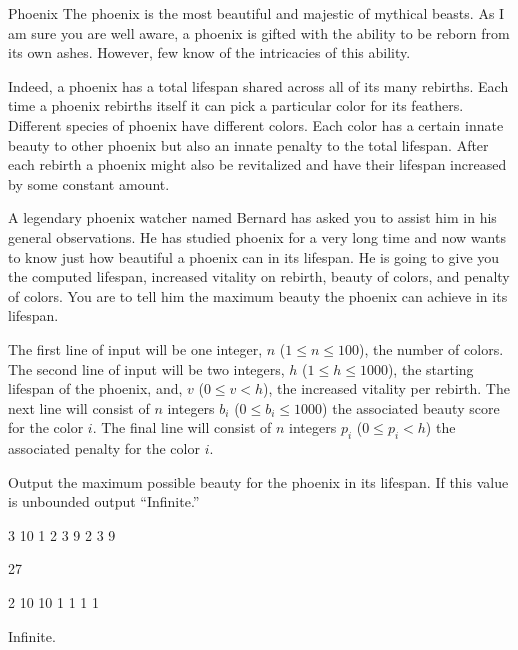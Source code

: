 \begin{problem}{Phoenix}
The phoenix is the most beautiful and majestic of mythical beasts.
As I am sure you are well aware, a phoenix is gifted with the ability to be reborn from its own ashes.
However, few know of the intricacies of this ability.

Indeed, a phoenix has a total lifespan shared across all of its many rebirths.
Each time a phoenix rebirths itself it can pick a particular color for its feathers.
Different species of phoenix have different colors.
Each color has a certain innate beauty to other phoenix but also an innate penalty to the total lifespan.
After each rebirth a phoenix might also be revitalized and have their lifespan increased by some constant amount.

A legendary phoenix watcher named Bernard has asked you to assist him in his general observations.
He has studied phoenix for a very long time and now wants to know just how beautiful a phoenix can in its lifespan.
He is going to give you the computed lifespan, increased vitality on rebirth, beauty of colors, and penalty of colors.
You are to tell him the maximum beauty the phoenix can achieve in its lifespan.
\end{problem}

\begin{formalin}
The first line of input will be one integer, $n$ ($1 \leq n \leq 100$), the number of colors.
The second line of input will be two integers, $h$ ($1 \leq h \leq 1000$), the starting lifespan of the phoenix, and, $v$ ($0 \leq v < h$), the increased vitality per rebirth.
The next line will consist of $n$ integers $b_i$ ($0 \leq b_i \leq 1000$) the associated beauty score for the color $i$.
The final line will consist of $n$ integers $p_i$ ($0 \leq p_i < h$) the associated penalty for the color $i$.
\end{formalin}

\begin{formalout}
Output the maximum possible beauty for the phoenix in its lifespan.
If this value is unbounded output ``Infinite.''
\end{formalout}

\begin{datain}
3
10 1
2 3 9
2 3 9
\end{datain}
\begin{dataout}
27
\end{dataout}

\begin{datain}
2
10 10
1 1
1 1
\end{datain}
\begin{dataout}
Infinite.
\end{dataout}
